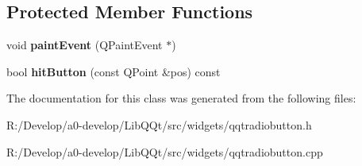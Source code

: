 \subsection*{Protected Member Functions}
\begin{DoxyCompactItemize}
\item 
\mbox{\label{class_q_qt_radio_button_a794924b710f3195292f02b629aceeb80}} 
void {\bfseries paint\+Event} (Q\+Paint\+Event $\ast$)
\item 
\mbox{\label{class_q_qt_radio_button_ae493118125beb8f906bbd39bb2b03fce}} 
bool {\bfseries hit\+Button} (const Q\+Point \&pos) const
\end{DoxyCompactItemize}


The documentation for this class was generated from the following files\+:\begin{DoxyCompactItemize}
\item 
R\+:/\+Develop/a0-\/develop/\+Lib\+Q\+Qt/src/widgets/qqtradiobutton.\+h\item 
R\+:/\+Develop/a0-\/develop/\+Lib\+Q\+Qt/src/widgets/qqtradiobutton.\+cpp\end{DoxyCompactItemize}
